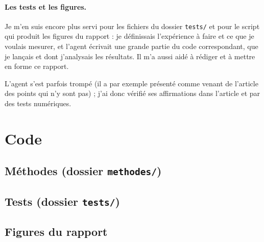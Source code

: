 \documentclass[11pt,a4paper]{article}
\begin{document}
\paragraph{Les tests et les figures.} Je m'en suis encore plus servi pour les fichiers du dossier
\texttt{tests/} et pour le script qui produit les figures du rapport : je définissais l'expérience à faire
et ce que je voulais mesurer, et l'agent écrivait une grande partie du code correspondant, que je lançais
et dont j'analysais les résultats. Il m'a aussi aidé à rédiger et à mettre en forme ce rapport.

L'agent s'est parfois trompé (il a par exemple présenté comme venant de l'article des points qui n'y sont
pas) ; j'ai donc vérifié ses affirmations dans l'article et par des tests numériques.

\clearpage
\section{Code}\label{sec:code}

\subsection{Méthodes (dossier \texttt{methodes/})}






\subsection{Tests (dossier \texttt{tests/})}











\subsection{Figures du rapport}

\end{document}

